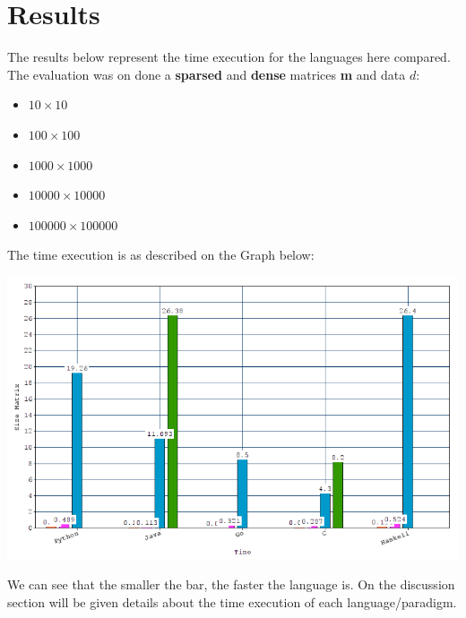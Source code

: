 \documentclass[conference]{IEEEtran}
\begin{document}
\section{Results}

The results below represent the time execution for the languages here compared. The evaluation was on done a \textbf{sparsed} and \textbf{dense} matrices \textbf{m} and data $d$:

\begin{itemize}
\item $10\times10$
\item $100\times100$
\item $1000\times1000$
\item $10000\times10000$
\item $100000\times100000$
\end{itemize} 

The time execution is as described on the Graph below:

\includegraphics[scale=0.30]{data_ass4}

We can see that the smaller the bar, the faster the language is. On the discussion section will be given details about the time execution of each language/paradigm.
\end{document}
